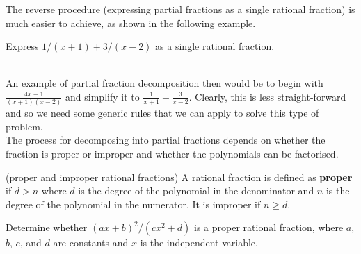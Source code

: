 The reverse procedure (expressing partial fractions as a single rational fraction) is much easier to achieve, as shown in the following example.

\begin{example}
    Express $1/(x+1) + 3/(x-2)$ as a single rational fraction.
\end{example}
\\

An example of partial fraction decomposition then would be to begin with $\frac{4x-1}{(x+1)(x-2)}$ and simplify it to $\frac{1}{x+1} + \frac{3}{x-2}$. Clearly, this is less straight-forward and so we need some generic rules that we can apply to solve this type of problem.\\

The process for decomposing into partial fractions depends on whether the fraction is proper or improper and whether the polynomials can be factorised.   

\begin{definition}
    (proper and improper rational fractions) A rational fraction is defined as \textbf{proper} if $d > n$ where $d$ is the degree of the polynomial in the denominator and $n$ is the degree of the polynomial in the numerator. It is improper if $n \geq d$. 
\end{definition}

\begin{example}
    Determine whether $(ax + b)^2/(cx^2 + d)$ is a proper rational fraction, where $a$, $b$, $c$, and $d$ are constants and $x$ is the independent variable.
\end{example}
\\

